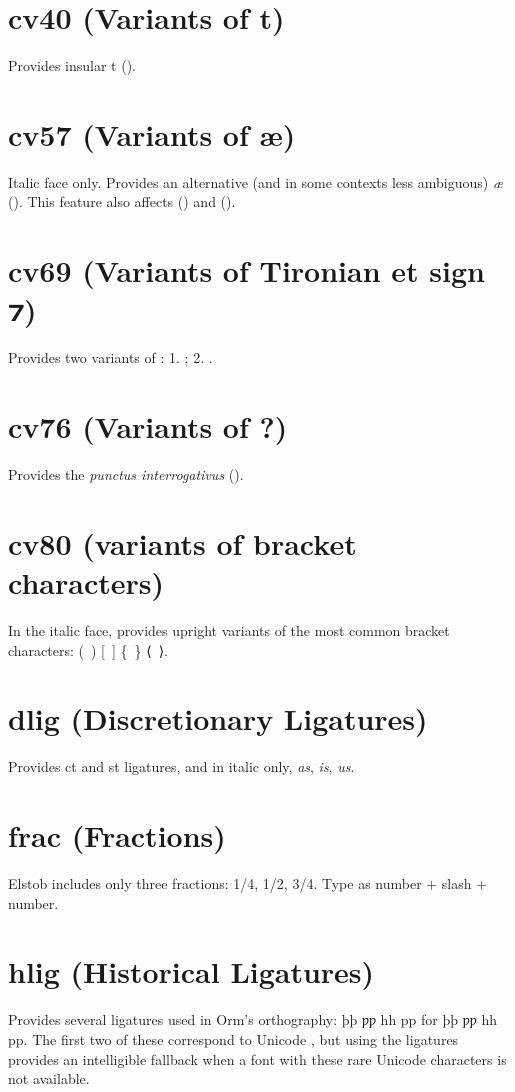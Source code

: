 \documentclass[12pt,letterpaper,openany]{book}
\begin{document}
\section{cv40 (Variants of t)}
Provides insular t ().

\section{cv57 (Variants of æ)}
Italic face only. Provides an alternative (and in some contexts less ambiguous)
\textit{æ} (\textit{}).
This feature also affects  (\textit{})
and  (\textit{}).

\section{cv69 (Variants of Tironian et sign ⁊)}
Provides two variants of : 1. ; 2. .

\section{cv76 (Variants of ?)}
Provides the \textit{punctus interrogativus} ().

\section{cv80 (variants of bracket characters)}
In the italic face, provides upright variants of the most common bracket
characters: (\ ) [\ ] \{\ \} ⟨\ ⟩.

\section{dlig (Discretionary Ligatures)}
Provides { ct} and
{ st} ligatures, and in italic only,
{ \textit{as}, \textit{is}, \textit{us}}.

\section{frac (Fractions)}
Elstob includes only three fractions: { 1/4, 1/2,
3/4}. Type as number + slash + number.

\section{hlig (Historical Ligatures)}
Provides several ligatures used in Orm’s orthography:
{ þþ ƿƿ hh pp} for
{þþ ƿƿ hh pp}. The first two of these correspond
to Unicode , but using the ligatures provides an intelligible
fallback when a font with these rare Unicode characters is not available.
\end{document}

